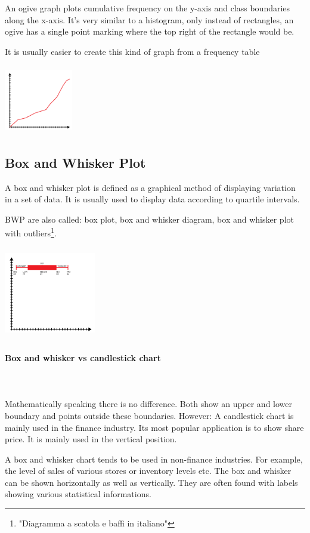\documentclass{article}
\begin{document}
An ogive graph plots cumulative frequency on the y-axis and class boundaries along the x-axis. It’s very similar to a histogram, only instead of rectangles, an ogive has a single point marking where the top right of the rectangle would be. 

It is usually easier to create this kind of graph from a frequency table

\includegraphics[width=3cm, height=3cm]{ogive_chart}

\subsection{Box and Whisker Plot}
A box and whisker plot is defined as a graphical method of displaying variation in a set of data. It is usually used to display data according to quartile intervals.

BWP are also called: box plot, box and whisker diagram, box and whisker plot with outliers\footnote{"Diagramma a scatola e baffi in italiano"}.

\includegraphics[width=4cm, height=4cm]{box_whisker_chart}

\paragraph{Box and whisker vs candlestick chart}\mbox{} \\
\mbox{} \\
Mathematically speaking there is no difference. Both show an upper and lower boundary and points outside these boundaries. However:
A candlestick chart is mainly used in the finance industry. Its most popular application is to show share price. It is mainly used in the vertical position.

A  box and whisker chart tends to be used in non-finance industries. For example, the level of sales of various stores or inventory levels etc. The box and whisker can be shown horizontally as well as vertically. They are often found with labels showing various statistical informations. 
\end{document}
